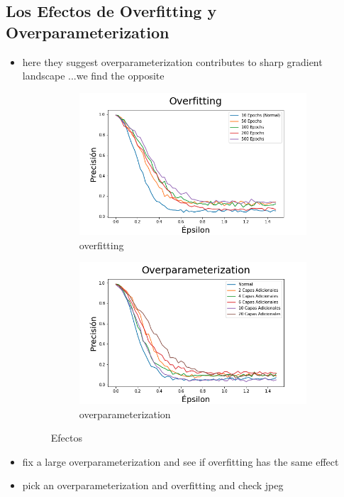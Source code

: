 \subsection{Los Efectos de Overfitting y Overparameterization}
\begin{itemize}
    \item here they suggest overparameterization contributes to sharp gradient landscape \cite{ma2020understanding}...we find the opposite
    \begin{figure}[h]
        \centering
        \begin{subfigure}[b]{0.49\textwidth}
            \centering
            \includegraphics[width=\textwidth]{images/overfit_vs_attack.png}
            \caption{overfitting}
            \label{overfit}
        \end{subfigure}
        \begin{subfigure}[b]{0.49\textwidth}
            \centering
            \includegraphics[width=\textwidth]{images/overparam_vs_attack.png}
            \caption{overparameterization}
            \label{overparam}
        \end{subfigure}
        \caption{Efectos}
        \label{overaparam_overfit}
    \end{figure}
    
    \item fix a large overparameterization and see if overfitting has the same effect
    \item pick an overparameterization and overfitting and check jpeg

\end{itemize}
